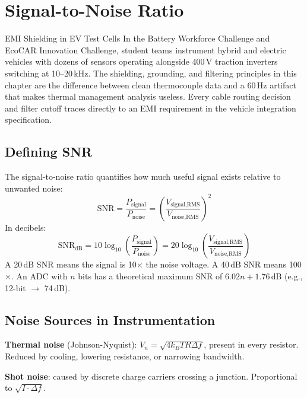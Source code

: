 \documentclass[11pt,letterpaper,twoside,openany]{book}
\begin{document}
\chapter{Signal-to-Noise Ratio}
\label{ch:snr}

\begin{industrybox}{EMI Shielding in EV Test Cells}
In the Battery Workforce Challenge and EcoCAR Innovation Challenge, student teams instrument hybrid and electric vehicles with dozens of sensors operating alongside 400\,V traction inverters switching at 10--20\,kHz. The shielding, grounding, and filtering principles in this chapter are the difference between clean thermocouple data and a 60\,Hz artifact that makes thermal management analysis useless. Every cable routing decision and filter cutoff traces directly to an EMI requirement in the vehicle integration specification.
\end{industrybox}

\section{Defining SNR}
The signal-to-noise ratio quantifies how much useful signal exists relative to unwanted noise:
\begin{equation}
\text{SNR} = \frac{P_{\text{signal}}}{P_{\text{noise}}} = \left(\frac{V_{\text{signal,RMS}}}{V_{\text{noise,RMS}}}\right)^2
\end{equation}
In decibels:
\begin{equation}
\text{SNR}_{\text{dB}} = 10 \log_{10}\left(\frac{P_{\text{signal}}}{P_{\text{noise}}}\right) = 20 \log_{10}\left(\frac{V_{\text{signal,RMS}}}{V_{\text{noise,RMS}}}\right)
\end{equation}
A 20\,dB SNR means the signal is 10$\times$ the noise voltage. A 40\,dB SNR means 100$\times$. An ADC with $n$ bits has a theoretical maximum SNR of $6.02n + 1.76$\,dB (e.g., 12-bit $\to$ 74\,dB).

\section{Noise Sources in Instrumentation}
\textbf{Thermal noise} (Johnson-Nyquist): $V_n = \sqrt{4k_B T R \Delta f}$, present in every resistor. Reduced by cooling, lowering resistance, or narrowing bandwidth.

\textbf{Shot noise}: caused by discrete charge carriers crossing a junction. Proportional to $\sqrt{I \cdot \Delta f}$.
\end{document}
